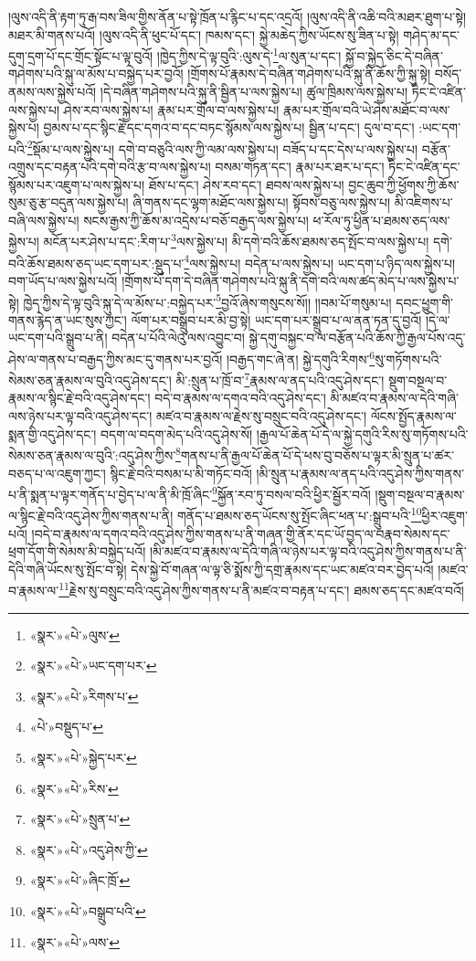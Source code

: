 །ལུས་འདི་ནི་རྟག་ཏུ་རྒ་བས་ཟིལ་གྱིས་ནོན་པ་སྟེ་ཁྲོན་པ་རྙིང་པ་དང་འདྲའོ། །ལུས་འདི་ནི་འཆི་བའི་མཐར་ཐུག་པ་སྟེ། མཐར་མི་གནས་པའོ། །ལུས་འདི་ནི་ཕུང་པོ་དང་། ཁམས་དང་། སྐྱེ་མཆེད་ཀྱིས་ཡོངས་སུ་ཟིན་པ་སྟེ། གཤེད་མ་དང་དུག་དྲག་པོ་དང་གྲོང་སྟོང་པ་ལྟ་བུའོ། །ཁྱེད་ཀྱིས་དེ་ལྟ་བུའི་:ལུས་དེ་\footnote{«སྣར་»«པེ་»ལུས་}ལ་སུན་པ་དང་། སྐྱོ་བ་སྐྱེད་ཅིང་དེ་བཞིན་གཤེགས་པའི་སྐུ་ལ་མོས་པ་བསྐྱེད་པར་བྱའོ། །གྲོགས་པོ་རྣམས་དེ་བཞིན་གཤེགས་པའི་སྐུ་ནི་ཆོས་ཀྱི་སྐུ་སྟེ། བསོད་ནམས་ལས་སྐྱེས་པའོ། །དེ་བཞིན་གཤེགས་པའི་སྐུ་ནི་སྦྱིན་པ་ལས་སྐྱེས་པ། ཚུལ་ཁྲིམས་ལས་སྐྱེས་པ། ཏིང་ངེ་འཛིན་ལས་སྐྱེས་པ། ཤེས་རབ་ལས་སྐྱེས་པ། རྣམ་པར་གྲོལ་བ་ལས་སྐྱེས་པ། རྣམ་པར་གྲོལ་བའི་ཡེ་ཤེས་མཐོང་བ་ལས་སྐྱེས་པ། བྱམས་པ་དང་སྙིང་རྗེ་དང་དགའ་བ་དང་བཏང་སྙོམས་ལས་སྐྱེས་པ། སྦྱིན་པ་དང་། དུལ་བ་དང་། :ཡང་དག་པའི་\footnote{«སྣར་»«པེ་»ཡང་དག་པར་}སྡོམ་པ་ལས་སྐྱེས་པ། དགེ་བ་བཅུའི་ལས་ཀྱི་ལམ་ལས་སྐྱེས་པ། བཟོད་པ་དང་དེས་པ་ལས་སྐྱེས་པ། བརྩོན་འགྲུས་དང་བརྟན་པའི་དགེ་བའི་རྩ་བ་ལས་སྐྱེས་པ། བསམ་གཏན་དང་། རྣམ་པར་ཐར་པ་དང་། ཏིང་ངེ་འཛིན་དང་སྙོམས་པར་འཇུག་པ་ལས་སྐྱེས་པ། ཐོས་པ་དང་། ཤེས་རབ་དང་། ཐབས་ལས་སྐྱེས་པ། བྱང་ཆུབ་ཀྱི་ཕྱོགས་ཀྱི་ཆོས་སུམ་ཅུ་རྩ་བདུན་ལས་སྐྱེས་པ། ཞི་གནས་དང་ལྷག་མཐོང་ལས་སྐྱེས་པ། སྟོབས་བཅུ་ལས་སྐྱེས་པ། མི་འཇིགས་པ་བཞི་ལས་སྐྱེས་པ། སངས་རྒྱས་ཀྱི་ཆོས་མ་འདྲེས་པ་བཅོ་བརྒྱད་ལས་སྐྱེས་པ། ཕ་རོལ་ཏུ་ཕྱིན་པ་ཐམས་ཅད་ལས་སྐྱེས་པ། མངོན་པར་ཤེས་པ་དང་:རིག་པ་\footnote{«སྣར་»«པེ་»རིགས་པ་}ལས་སྐྱེས་པ། མི་དགེ་བའི་ཆོས་ཐམས་ཅད་སྤོང་བ་ལས་སྐྱེས་པ། དགེ་བའི་ཆོས་ཐམས་ཅད་ཡང་དག་པར་:སྡུད་པ་\footnote{«པེ་»བསྡུད་པ་}ལས་སྐྱེས་པ། བདེན་པ་ལས་སྐྱེས་པ། ཡང་དག་པ་ཉིད་ལས་སྐྱེས་པ། བག་ཡོད་པ་ལས་སྐྱེས་པའོ། །གྲོགས་པོ་དག་དེ་བཞིན་གཤེགས་པའི་སྐུ་ནི་དགེ་བའི་ལས་ཚད་མེད་པ་ལས་སྐྱེས་པ་སྟེ། ཁྱེད་ཀྱིས་དེ་ལྟ་བུའི་སྐུ་དེ་ལ་མོས་པ་:བསྐྱེད་པར་\footnote{«སྣར་»«པེ་»སྐྱེད་པར་}བྱའོ་ཞེས་གསུངས་སོ།། །།བམ་པོ་གསུམ་པ། དབང་ཕྱུག་གི་གནས་རྙེད་ན་ཡང་སུས་ཀྱང་། ལོག་པར་བསྒྲུབ་པར་མི་བྱ་སྟེ། ཡང་དག་པར་སྒྲུབ་པ་ལ་ནན་ཏན་དུ་བྱའོ། །དེ་ལ་ཡང་དག་པའི་སྒྲུབ་པ་ནི། བདེན་པ་པོའི་ལེའུ་ལས་འབྱུང་བ། སྐྱེ་དགུ་བསྐྱང་བ་ལ་བརྩོན་པའི་ཆོས་ཀྱི་རྒྱལ་པོས་འདུ་ཤེས་ལ་གནས་པ་བརྒྱད་ཀྱིས་མང་དུ་གནས་པར་བྱའོ། །བརྒྱད་གང་ཞེ་ན། སྐྱེ་དགུའི་རིགས་\footnote{«སྣར་»«པེ་»རིས་}སུ་གཏོགས་པའི་སེམས་ཅན་རྣམས་ལ་བུའི་འདུ་ཤེས་དང་། མི་:སྲུན་པ་ཁྲོ་བ་\footnote{«སྣར་»«པེ་»སྲུན་པ་}རྣམས་ལ་ནད་པའི་འདུ་ཤེས་དང་། སྡུག་བསྔལ་བ་རྣམས་ལ་སྙིང་རྗེ་བའི་འདུ་ཤེས་དང་། བདེ་བ་རྣམས་ལ་དགའ་བའི་འདུ་ཤེས་དང་། མི་མཛའ་བ་རྣམས་ལ་དེའི་གཞི་ལས་ཉེས་པར་ལྟ་བའི་འདུ་ཤེས་དང་། མཛའ་བ་རྣམས་ལ་རྗེས་སུ་བསྲུང་བའི་འདུ་ཤེས་དང་། ལོངས་སྤྱོད་རྣམས་ལ་སྨན་གྱི་འདུ་ཤེས་དང་། བདག་ལ་བདག་མེད་པའི་འདུ་ཤེས་སོ། །རྒྱལ་པོ་ཆེན་པོ་དེ་ལ་སྐྱེ་དགུའི་རིས་སུ་གཏོགས་པའི་སེམས་ཅན་རྣམས་ལ་བུའི་:འདུ་ཤེས་ཀྱིས་\footnote{«སྣར་»«པེ་»འདུ་ཤེས་ཀྱི་}གནས་པ་ནི་རྒྱལ་པོ་ཆེན་པོ་དེ་ཕས་བུ་བཅོས་པ་ལྟར་མི་སྲུན་པ་ཚར་བཅད་པ་ལ་འཇུག་ཀྱང་། སྙིང་རྗེ་བའི་བསམ་པ་མི་གཏོང་བའོ། །མི་སྲུན་པ་རྣམས་ལ་ནད་པའི་འདུ་ཤེས་ཀྱིས་གནས་པ་ནི་སྨན་པ་ལྟར་གནོད་པ་བྱེད་པ་ལ་ནི་མི་ཁྲོ་ཞིང་\footnote{«སྣར་»«པེ་»ཞིང་ཁྲོ་}སྐྱོན་རབ་ཏུ་བསལ་བའི་ཕྱིར་སྦྱོར་བའོ། །སྡུག་བསྔལ་བ་རྣམས་ལ་སྙིང་རྗེ་བའི་འདུ་ཤེས་ཀྱིས་གནས་པ་ནི། གནོད་པ་ཐམས་ཅད་ཡོངས་སུ་སྤོང་ཞིང་ཕན་པ་:སྒྲུབ་པའི་\footnote{«སྣར་»«པེ་»བསྒྲུབ་པའི་}ཕྱིར་འཇུག་པའོ། །བདེ་བ་རྣམས་ལ་དགའ་བའི་འདུ་ཤེས་ཀྱིས་གནས་པ་ནི་གཞན་གྱི་ནོར་དང་ཡོ་བྱད་ལ་བརྣབ་སེམས་དང་ཕྲག་དོག་གི་སེམས་མི་བསྐྱེད་པའོ། །མི་མཛའ་བ་རྣམས་ལ་དེའི་གཞི་ལ་ཉེས་པར་ལྟ་བའི་འདུ་ཤེས་ཀྱིས་གནས་པ་ནི་དེའི་གཞི་ཡོངས་སུ་སྤོང་བ་སྟེ། དེས་སྐྱེ་བོ་གཞན་ལ་ལྟ་ཅི་སྨོས་ཀྱི་དགྲ་རྣམས་དང་ཡང་མཛའ་བར་བྱེད་པའོ། །མཛའ་བ་རྣམས་ལ་\footnote{«སྣར་»«པེ་»ལས་}རྗེས་སུ་བསྲུང་བའི་འདུ་ཤེས་ཀྱིས་གནས་པ་ནི་མཛའ་བ་བརྟན་པ་དང་། ཐམས་ཅད་དང་མཛའ་བའོ། 